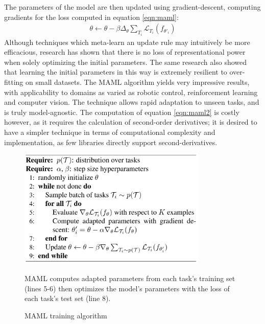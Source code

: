 \documentclass{report}
\begin{document}
The parameters of the model are then updated using gradient-descent, computing gradients for the loss computed in equation \ref{eqn:maml}:
\begin{align}
 \theta \gets \theta - \beta\Delta_\theta \sum_{T_i} \mathcal{L}_{T_{i}}(f_{\theta'_i}) \label{eqn:maml2}
\end{align}
Although techniques which meta-learn an update rule may intuitively be more efficacious, research \parencite{universality} has shown that there is no loss of representational power when solely optimizing the initial parameters. The same research also showed that learning the initial parameters in this way is extremely resilient to over-fitting on small datasets. The MAML algorithm yields very impressive results, with applicability to domains as varied as robotic control, reinforcement learning and computer vision. The technique allows rapid adaptation to unseen tasks, and is truly model-agnostic. The computation of equation \ref{eqn:maml2} is costly however, as it requires the calculation of second-order derivatives; it is desired to have a simpler technique in terms of computational complexity and implementation, as few libraries directly support second-derivatives. \par
\begin{figure}[h]
 \centering
 \includegraphics[width=9cm]{mamlalgo}
 \caption{MAML training algorithm}
 MAML computes adapted parameters from each task's training set (lines 5-6) then optimizes the model's parameters with the loss of each task's test set (line 8).
 \label{fig:maml-algo:1}
\end{figure}
\end{document}
